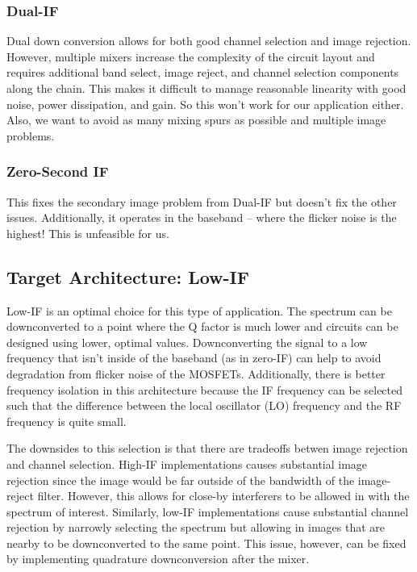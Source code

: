 \subsubsection{Dual-IF} 
Dual down conversion allows for both good channel selection and image rejection. However, multiple mixers increase the complexity of the circuit layout and requires additional band select, image reject, and channel selection components along the chain. This makes it difficult to manage reasonable linearity with good noise, power dissipation, and gain. So this won’t work for our application either. Also,  we want to avoid as many mixing spurs as possible and multiple image problems.

\subsubsection{Zero-Second IF}
This fixes the secondary image problem from Dual-IF but doesn’t fix the other issues. Additionally, it operates in the baseband -- where the flicker noise is the highest! This is unfeasible for us.

\subsection{Target Architecture: Low-IF}
Low-IF is an optimal choice for this type of application. The spectrum can be downconverted to a point where the Q factor is much lower and circuits can be designed using lower, optimal values. Downconverting the signal to a low frequency that isn't inside of the baseband (as in zero-IF) can help to avoid degradation from flicker noise of the MOSFETs.  Additionally, there is better frequency isolation in this architecture because the IF frequency can be selected such that the difference between the local oscillator (LO) frequency and the RF frequency is quite small. 

The downsides to this selection is that there are tradeoffs betwen image rejection and channel selection. High-IF implementations causes substantial image rejection since the image would be far outside of the bandwidth of the image-reject filter. However, this allows for close-by interferers to be allowed in with the spectrum of interest. Similarly, low-IF implementations cause substantial channel rejection by narrowly selecting the spectrum but allowing in images that are nearby to be downconverted to the same point. This issue, however,  can be fixed by implementing quadrature downconversion after the mixer.